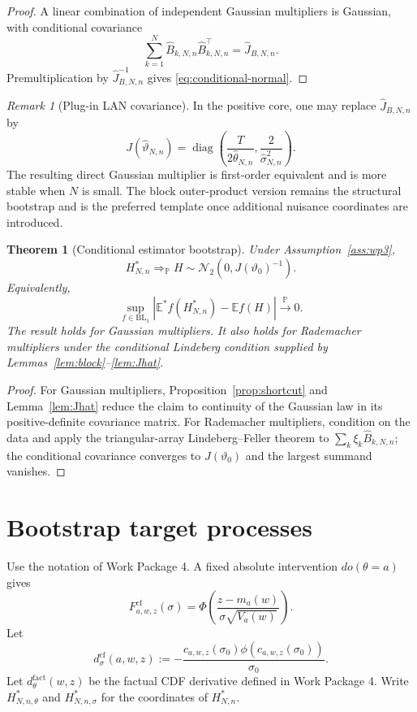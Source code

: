 \documentclass[11pt]{article}
\newtheorem{theorem}[assumption]{Theorem}
\theoremstyle{remark}
\newtheorem{remark}[assumption]{Remark}
\newcommand{\E}{\mathbb E}
\newcommand{\Pp}{\mathbb P}
\newcommand{\diag}{\operatorname{diag}}
\newcommand{\cf}{\mathrm{cf}}
\newcommand{\fact}{\mathrm{fact}}
\newcommand{\thetahat}{\widehat\theta_{N,n}}
\newcommand{\sigmahat}{\widehat\sigma_{N,n}}
\newcommand{\vhat}{\widehat\vartheta_{N,n}}
\newcommand{\vzero}{\vartheta_0}
\newcommand{\Jhat}{\widehat J_{B,N,n}}
\newcommand{\BL}{\mathrm{BL}_1}
\newcommand{\Ph}{\Phi}
\newcommand{\ph}{\phi}
\begin{document}
\begin{proof}
A linear combination of independent Gaussian multipliers is Gaussian, with conditional covariance
\[
 \sum_{k=1}^N\widehat B_{k,N,n}\widehat B_{k,N,n}^\top=\Jhat.
\]
Premultiplication by $\Jhat^{-1}$ gives \eqref{eq:conditional-normal}.
\end{proof}

\begin{remark}[Plug-in LAN covariance]
In the positive core, one may replace $\Jhat$ by
\[
 J(\vhat)
 =
 \diag\left(\frac{T}{2\thetahat},\frac{2}{\sigmahat^2}\right).
\]
The resulting direct Gaussian multiplier is first-order equivalent and is more stable when $N$ is small. The block outer-product version remains the structural bootstrap and is the preferred template once additional nuisance coordinates are introduced.
\end{remark}

\begin{theorem}[Conditional estimator bootstrap]\label{thm:parameter-bootstrap}
Under Assumption~\ref{ass:wp3},
\begin{equation}\label{eq:H-bootstrap}
 H_{N,n}^*
 \Rightarrow_{\Pp}
 H\sim\mathcal N_2(0,J(\vzero)^{-1}).
\end{equation}
Equivalently,
\begin{equation}\label{eq:BL}
 \sup_{f\in\BL}
 \left|
 \E^*f(H_{N,n}^*)-\E f(H)
 \right|
 \overset{\Pp}{\longrightarrow}0.
\end{equation}
The result holds for Gaussian multipliers. It also holds for Rademacher multipliers under the conditional Lindeberg condition supplied by Lemmas~\ref{lem:block}--\ref{lem:Jhat}.
\end{theorem}

\begin{proof}
For Gaussian multipliers, Proposition~\ref{prop:shortcut} and Lemma~\ref{lem:Jhat} reduce the claim to continuity of the Gaussian law in its positive-definite covariance matrix. For Rademacher multipliers, condition on the data and apply the triangular-array Lindeberg--Feller theorem to $\sum_k\xi_k\widehat B_{k,N,n}$; the conditional covariance converges to $J(\vzero)$ and the largest summand vanishes.
\end{proof}

\section{Bootstrap target processes}

Use the notation of Work Package 4. A fixed absolute intervention $do(\theta=a)$ gives
\[
 F_{a,w,z}^{\cf}(\sigma)
 =
 \Ph\left(
 \frac{z-m_a(w)}
 {\sigma\sqrt{V_a(w)}}
 \right).
\]
Let
\begin{equation}\label{eq:dsigma}
 d_\sigma^{\cf}(a,w,z)
 :=
 -\frac{c_{a,w,z}(\sigma_0)\ph(c_{a,w,z}(\sigma_0))}
 {\sigma_0}.
\end{equation}
Let $d_\theta^{\fact}(w,z)$ be the factual CDF derivative defined in Work Package 4. Write $H_{N,n,\theta}^*$ and $H_{N,n,\sigma}^*$ for the coordinates of $H_{N,n}^*$.
\end{document}
